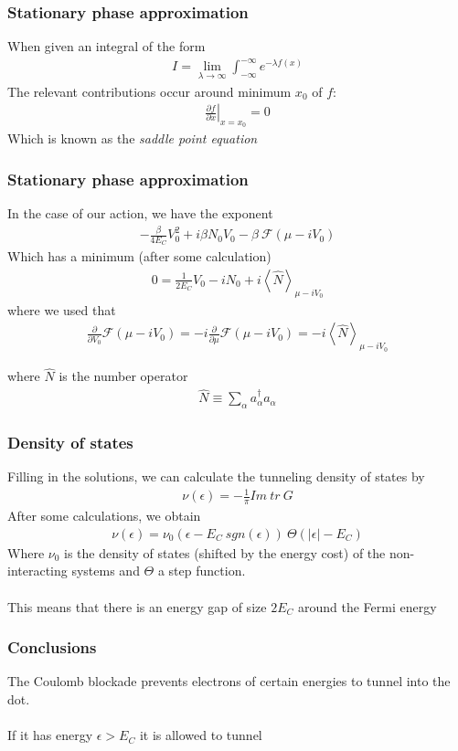 \documentclass[]{beamer}
\begin{document}
\begin{frame}[t]\frametitle{Stationary phase approximation}
  When given an integral of the form
  \begin{align*}
    I = \lim_{\lambda \to \infty} \int_{-\infty}^{-\infty} e^{-\lambda f(x)}
  \end{align*}
  The relevant contributions occur around minimum $x_0$ of $f$:
  \begin{align*}
    \left.\frac{\partial f}{\partial x} \right\rvert_{x = x_0} = 0
  \end{align*}
  Which is known as the \emph{saddle point equation}
\end{frame}

\begin{frame}[t]\frametitle{Stationary phase approximation}
  In the case of our action, we have the exponent
  \begin{align*}
    -\frac{\beta}{4 E_C} V_0^2 + i \beta N_0 V_0 - \beta ~ \mathcal{F}(\mu - i V_0)
  \end{align*}
  Which has a minimum (after some calculation)
  \begin{align*}
    0 = \frac{1}{2 E_C} V_0 - i N_0 + i \left<\hat{N}\right>_{\mu - i V_0}
  \end{align*}
  where we used that
  \begin{align*}
    \frac{\partial}{\partial V_0} \mathcal{F}(\mu - i V_0) = - i \frac{\partial}{\partial \mu} \mathcal{F}(\mu - i V_0) = - i \left<\hat{N}\right>_{\mu - i V_0}
  \end{align*}

  where $\hat{N}$ is the number operator
  \begin{align*}
    \hat{N} \equiv \sum_{\alpha} a_{\alpha}^{\dagger} a_{\alpha}
  \end{align*}

\end{frame}

\begin{frame}[t]\frametitle{Density of states}
  Filling in the solutions, we can calculate the tunneling density of states by
  \begin{align*}
    \nu(\epsilon) = - \frac{1}{\pi} Im~tr~G
  \end{align*}
  After some calculations, we obtain
  \begin{align*}
    \nu(\epsilon) = \nu_0(\epsilon - E_C ~ sgn(\epsilon)) ~ \Theta(|\epsilon| - E_C)
  \end{align*}
  Where $\nu_0$ is the density of states (shifted by the energy cost) of the non-interacting systems and $\Theta$ a step function.\\
  ~\\
  This means that there is an energy gap of size $2 E_C$ around the Fermi energy


\end{frame}

\begin{frame}[t]\frametitle{Conclusions}
  The Coulomb blockade prevents electrons of certain energies to tunnel into the dot. \\
  ~\\
  If it has energy $\epsilon > E_C$ it is allowed to tunnel


\end{frame}
\end{document}
